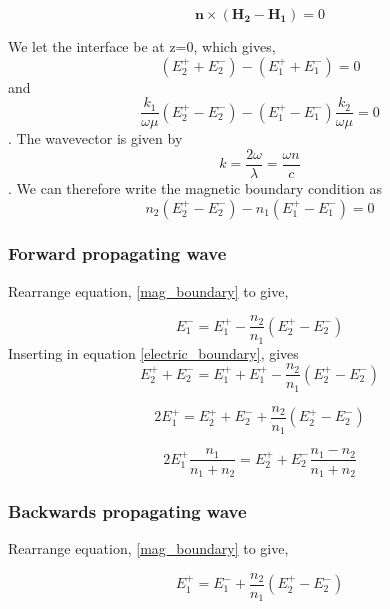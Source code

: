 \begin{equation}
\mathbf{n} \times (\mathbf{H_2}-\mathbf{H_1})=0
\end{equation}

We let the interface be at z=0, which gives,
\begin{equation}
(E_{2}^{+}+E_{2}^{-})-(E_{1}^{+}+E_{1}^{-})=0
\label{electric_boundary}
\end{equation}
and
\begin{equation}
\frac{k_1}{\omega \mu}(E_{2}^{+}-E_{2}^{-})-(E_{1}^{+}-E_{1}^{-})\frac{k_2}{\omega \mu}=0
\end{equation}
.
The wavevector is given by
\begin{equation}
k=\frac{2 \omega }{\lambda}=\frac{\omega n}{c}
\end{equation}
.
We can therefore write the magnetic boundary condition as
\begin{equation}
n_2 (E_{2}^{+}-E_{2}^{-}) - n_1 (E_{1}^{+}-E_{1}^{-})=0
\label{mag_boundary}
\end{equation}

\subsubsection{Forward propagating wave}
Rearrange equation, \ref{mag_boundary} to give,

\begin{equation}
E_{1}^{-} = E_{1}^{+}-\frac{n_2}{n_1}(E_{2}^{+}-E_{2}^{-})
\end{equation}
Inserting in equation \ref{electric_boundary}, gives 
\begin{equation}
E_{2}^{+}+E_{2}^{-}=E_{1}^{+}+E_{1}^{+}-\frac{n_2}{n_1}(E_{2}^{+}-E_{2}^{-})
\end{equation}

\begin{equation}
2E_{1}^{+}=E_{2}^{+}+E_{2}^{-}+\frac{n_2}{n_1}(E_{2}^{+}-E_{2}^{-})
\end{equation}

\begin{equation}
2E_{1}^{+}\frac{n_1}{n_1+n_2}=E_{2}^{+}+E_{2}^{-}\frac{n_1-n_2}{n_1+n_2}
\end{equation}

\subsubsection{Backwards propagating wave}
Rearrange equation, \ref{mag_boundary} to give,

\begin{equation}
E_{1}^{+}=E_{1}^{-} +\frac{n_2}{n_1}(E_{2}^{+}-E_{2}^{-})
\end{equation}

